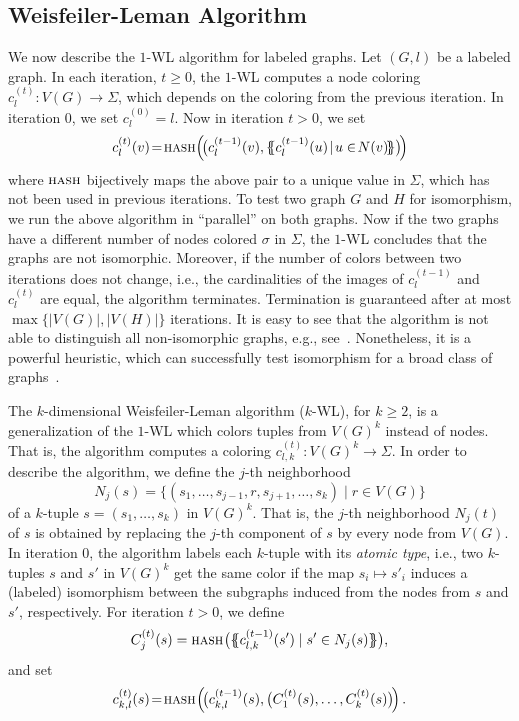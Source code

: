 \documentclass[letterpaper]{article}
\theoremstyle{definition}
\newcommand{\new}[1]{\emph{#1}}
\newcommand{\oms}{\{\!\!\{}
\newcommand{\cms}{\}\!\!\}}
\begin{document}
\subsection{Weisfeiler-Leman Algorithm}
We now describe the \textsc{$1$-WL} algorithm for labeled graphs. Let $(G,l)$ be a labeled graph. In each iteration, $t \geq 0$, the $1$-WL computes a node coloring $c^{(t)}_l \colon V(G) \to \Sigma$,
which depends on the coloring from the previous iteration.
In iteration $0$, we set $c^{(0)}_l = l$. Now in iteration $t>0$, we set 
\begin{equation}\label{eq:wlColoring}
	c_{l}^{(t)}(v) \!=\! \textsc{hash}\Big(\!\big(c_l^{(t-1)}(v),\oms c_l^{(t-1)}(u)\!\mid\!u \in\!N(v) \!\cms \big)\! \Big)
\end{equation}
where $\textsc{hash}$ bijectively maps the above pair to a unique value in $\Sigma$, which has not been used in previous iterations. To test two graph $G$ and $H$ for isomorphism, we run the above algorithm in ``parallel'' on both graphs. Now if the two graphs have a different number of nodes colored $\sigma$ in $\Sigma$, the \textsc{$1$-WL} concludes that the graphs are not isomorphic. Moreover, if the number of colors between two iterations does not change, i.e., the cardinalities of the images of $c_l^{(t-1)}$ and $c_l^{(t)}$ are equal, the algorithm terminates. Termination is guaranteed after at most $\max \{ |V(G)|,|V(H)| \}$ iterations. It is easy to see that the algorithm is not able to distinguish all non-isomorphic graphs, e.g., see~\cite{Cai+1992}. Nonetheless, it is a powerful heuristic, which can successfully test isomorphism for a broad class of graphs~\cite{Bab+1979}.


The $k$-dimensional Weisfeiler-Leman algorithm ($k$-WL), for $k \geq 2$, is a generalization of the $1$-WL which colors tuples from $V(G)^k$ instead of nodes. That is, the algorithm computes a coloring $c^{(t)}_{l,k} \colon V(G)^k \to \Sigma$. In order to describe the algorithm, we define the $j$-th neighborhood
\begin{equation}\label{gnei}
	N_j(s) \!=\! \{ ( s_1, \dotsc, s_{j-1}, r, s_{j+1}, \dotsc, s_k) \mid r \in V(G) \}
\end{equation}
of a $k$-tuple $s = (s_1, \dotsc, s_k )$ in $V(G)^k$. That is, the $j$-th neighborhood $N_j(t)$ of $s$ is obtained by replacing the $j$-th component of $s$ by every node from $V(G)$. In iteration $0$, the algorithm labels each $k$-tuple with its \new{atomic type}, i.e., two $k$-tuples $s$ and $s'$ in $V(G)^k$ get the same color if the map $s_i \mapsto s'_i$ induces a (labeled) isomorphism between the subgraphs induced from the nodes from $s$ and $s'$, respectively. For iteration $t > 0$, we define 
\begin{equation}\label{wl-prim}
	C^{(t)}_j(s) = \textsc{hash}_{}\big(\oms c^{(t-1)}_{l,k}(s') \mid s' \in N_j(s)\cms\big), 
\end{equation}
and set 
\begin{equation}\label{labelk}
	c_{k,l}^{(t)}(s)\!=\! \textsc{hash}_{}\Big( \!\big(c_{k,l}^{(t-1)}(s), \big( C^{(t)}_1(s), \dots, C^{(t)}_k(s)  \big) \! \Big)\,.
\end{equation}
\end{document}
